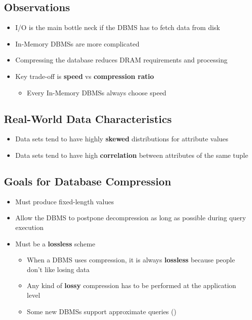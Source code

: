 \documentclass[11pt]{article}
\begin{document}
    \subsection*{Observations}
    \begin{itemize}
        \item I/O is the main bottle neck if the DBMS has to fetch data from disk
        \item In-Memory DBMSs are more complicated
        \item Compressing the database reduces DRAM requirements and processing
        \item Key trade-off is \textbf{speed} vs \textbf{compression ratio}
        \begin{itemize}
            \item Every In-Memory DBMSs always choose speed
        \end{itemize}
    \end{itemize}

    \subsection*{Real-World Data Characteristics}
    \begin{itemize}
        \item Data sets tend to have highly \textbf{skewed} distributions for attribute values
        \item Data sets tend to have high \textbf{correlation} between attributes of the same tuple
    \end{itemize}

    \subsection*{Goals for Database Compression}
    \begin{itemize}
        \item Must produce fixed-length values
        \item Allow the DBMS to postpone decompression as long as possible during query execution
        \item Must be a \textbf{lossless} scheme
        \begin{itemize}
            \item When a DBMS uses compression, it is always \textbf{lossless} because people don't like losing data
            \item Any kind of \textbf{lossy} compression has to be performed at the application level
            \item Some new DBMSs support approximate queries ()
        \end{itemize}
    \end{itemize}
\end{document}
